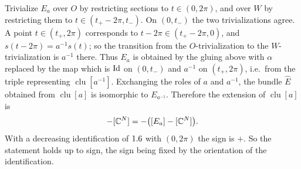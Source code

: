 Trivialize $E_a$ over $O$ by restricting sections to $t\in(0,2\pi)$, and over $W$ by
restricting them to $t\in(t_+-2\pi,t_-)$. On $(0,t_-)$ the two trivializations agree. A point
$t\in(t_+,2\pi)$ corresponds to $t-2\pi\in(t_+-2\pi,0)$, and $s(t-2\pi)=a^{-1}s(t)$; so the
transition from the $O$-trivialization to the $W$-trivialization is $a^{-1}$ there. Thus $E_a$ is
obtained by the gluing above with $\alpha$ replaced by the map which is $\operatorname{Id}$ on $(0,t_-)$ and
$a^{-1}$ on $(t_+,2\pi)$, i.e.\ from the triple representing $\operatorname{clu}[a^{-1}]$.
Exchanging the roles of $a$ and $a^{-1}$, the bundle $\hat E$ obtained from
$\operatorname{clu}[a]$ is isomorphic to $E_{a^{-1}}$. Therefore the extension of
$\operatorname{clu}[a]$ is
\begin{equation*}
  [E_{a^{-1}}]-[\C^N]=-\bigl([E_a]-[\C^N]\bigr).
\end{equation*}
With a decreasing identification of $1.6$ with $(0,2\pi)$ the sign is $+$. So the statement holds
up to sign, the sign being fixed by the orientation of the identification.
